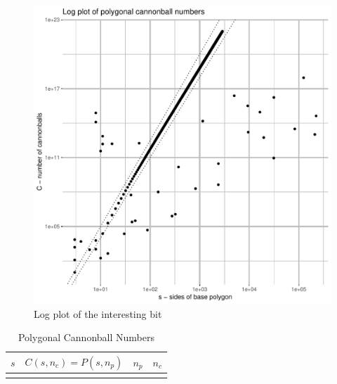 \begin{figure}[H]
\centering
\includegraphics[width=\textwidth,page=3]{../graph/Rplots.pdf}
\caption{Log plot of the interesting bit}
\label{fig_log_interesting}
\end{figure}

\begin{longtable}{*4r}
\toprule
\boldmath \(s\) & \boldmath \(C(s, n_c) = P(s, n_p)\)
& \boldmath \(n_p\) & \boldmath \(n_c\) \\
\midrule
\endhead

\bottomrule
\caption{Polygonal Cannonball Numbers}
\label{tab_ugly}
\end{longtable}
